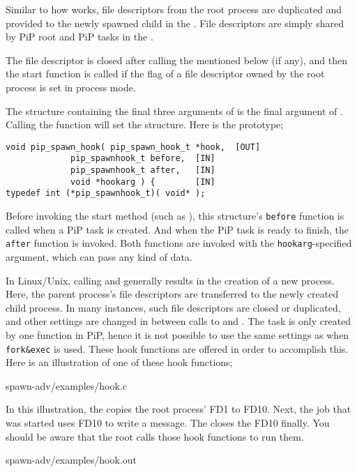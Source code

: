 Similar to how  works, file descriptors from the root
process are duplicated and provided to the newly spawned child in the
. File descriptors are simply shared by PiP root
and PiP tasks in the .

The file descriptor is closed after calling the 
mentioned below (if any), and then the start function is called if the 
 flag of a file descriptor owned by the root
process is set in process mode.

The structure containing the final three arguments of
 is the final argument of
. Calling the 
function will set the  structure. Here is
the prototype;  

\begin{lstlisting}[frame=tb]
void pip_spawn_hook( pip_spawn_hook_t *hook,  [OUT]
		     pip_spawnhook_t before,  [IN]
		     pip_spawnhook_t after,   [IN]
		     void *hookarg ) {        [IN]
typedef int (*pip_spawnhook_t)( void* );
\end{lstlisting}

Before invoking the start method (such as \main), this structure's
{\tt before} function is called when a PiP task is created. And when
the PiP task is ready to finish, the {\tt after} function is
invoked. Both functions are invoked with the {\tt hookarg}-specified
argument, which can pass any kind of data.

In Linux/Unix, calling  and 
generally results in the creation of a new process. Here, the parent
process's file descriptors are transferred to the newly created child
process. In many instances, such file descriptors are closed or
duplicated, and other settings are changed in between calls to
 and . The task is only 
created by one function in PiP, hence it is not possible to use the
same settings as when {\tt fork\&exec} is used. These hook functions are
offered in order to accomplish this. Here is an illustration of one of
these hook functions;

 {spawn-adv/examples/hook.c}

In this illustration, the  copies the root
process' FD1 to FD10. Next, the job that was started uses FD10 to
write a message. The  closes the FD10 finally.
You should be aware  that the root calls those hook functions to run
them. 


                {spawn-adv/examples/hook.out}
